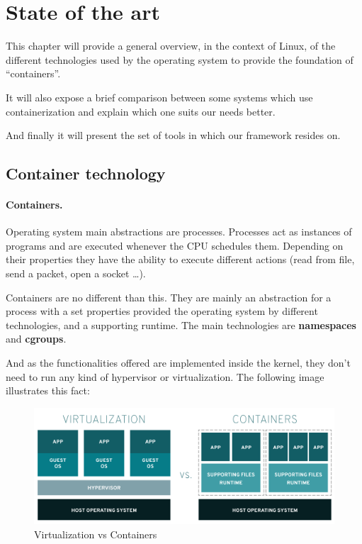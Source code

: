 \clearpage\section{State of the art}
This chapter will provide a general overview, in the context of Linux, of the different technologies used by the operating system to provide the foundation of ``containers''.

It will also expose a brief comparison between some systems which use containerization and explain which one suits our needs better.

And finally it will present the set of tools in which our framework resides on.

\subsection{Container technology}
\paragraph{Containers.} Operating system main abstractions are processes. Processes act as instances of programs and are executed whenever the CPU schedules them. Depending on their properties they have the ability to execute different actions (read from file, send a packet, open a socket \dots).

Containers are no different than this. They are mainly an abstraction for a process with a set properties provided the operating system by different technologies, and a supporting runtime. The main technologies are \textbf{namespaces} and \textbf{cgroups}.

And as the functionalities offered are implemented inside the kernel, they don't need to run any kind of hypervisor or virtualization. The following image illustrates this fact:

\begin{figure}[H]
	\label{fig:Virtualization vs Containers}
	\centering
	\includegraphics[width=\textwidth]{img/02/02-state-virtualization-vs-containers.png}
	\caption[Virtualization vs Containers]{\footnotesize{Virtualization vs Containers}}
\end{figure}

